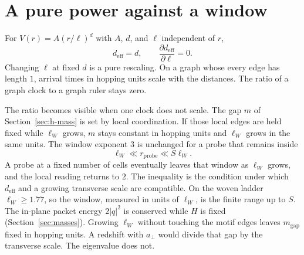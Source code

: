\section{A pure power against a window}
\label{sec:h-fixedd}

For \(V(r)=A(r/\ell)^d\) with \(A\), \(d\), and \(\ell\) independent of
\(r\),
\[
d_{\mathrm{eff}}=d,\qquad
\frac{\partial d_{\mathrm{eff}}}{\partial\ell}=0.
\]
Changing \(\ell\) at fixed \(d\) is a pure rescaling.
On a graph whose every edge has length \(1\), arrival times in hopping
units scale with the distances.
The ratio of a graph clock to a graph ruler stays zero.

The ratio becomes visible when one clock does not scale.
The gap \(m\) of Section~\ref{sec:h-mass} is set by local coordination.
If those local edges are held fixed while \(\ell_W\) grows, \(m\) stays
constant in hopping units and \(\ell_W\) grows in the same units.
The window exponent \(3\) is unchanged for a probe that remains inside
\[
\ell_W\ll r_{\mathrm{probe}}\ll S\ell_W.
\]
A probe at a fixed number of cells eventually leaves that window as
\(\ell_W\) grows, and the local reading returns to \(2\).
The inequality is the condition under which \(d_{\mathrm{eff}}\) and a
growing transverse scale are compatible.
On the woven ladder \(\ell_W\ge 1.77\), so the window, measured in units
of \(\ell_W\), is the finite range up to \(S\).
The in-plane packet energy \(2|q|^2\) is conserved while \(H\) is fixed
(Section~\ref{sec:masses}).
Growing \(\ell_W\) without touching the motif edges leaves
\(m_{\mathrm{gap}}\) fixed in hopping units.
A redshift with \(a_\perp\) would divide that gap by the transverse scale.
The eigenvalue does not.
